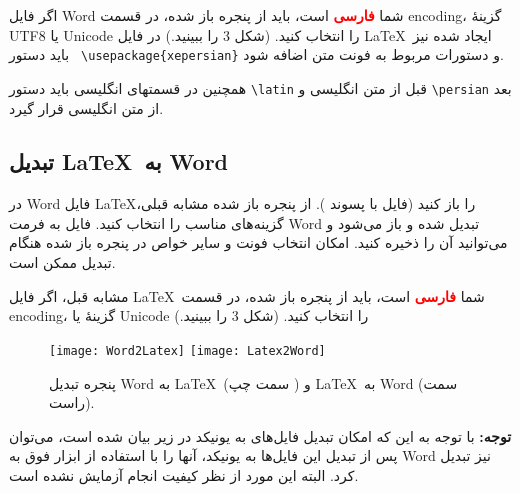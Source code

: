  اگر فایل Word شما \textcolor{red}{\bf فارسی} است، باید از پنجره باز شده، در قسمت encoding، 
 گزینۀ UTF8 یا Unicode  را انتخاب کنید. (شکل 3 را ببینید.) در فایل
 \LaTeX \ ایجاد شده نیز باید دستور \verb+ \usepackage{xepersian}+  و دستورات مربوط به فونت متن اضافه شود.
 
 همچنین در قسمتهای انگلیسی باید دستور \verb+\latin+  قبل از متن انگلیسی و \verb+\persian+ بعد از متن انگلیسی قرار گیرد.
 
 \subsection{تبدیل \LaTeX \ به Word}
  در Word   فایل \LaTeX  را باز کنید (فایل با پسوند ). از پنجره باز شده مشابه قبلی، گزینه‌های مناسب را انتخاب کنید. فایل  به فرمت 
  Word تبدیل شده و باز می‌شود و می‌توانید آن را ذخیره کنید. امکان انتخاب فونت و سایر خواص در پنجره باز شده هنگام تبدیل ممکن است.
  
  مشابه قبل، اگر فایل \LaTeX \ شما \textcolor{red}{\bf فارسی} است، باید از پنجره باز شده، در قسمت encoding، 
 گزینۀ  یا Unicode  را انتخاب کنید. (شکل 3 را ببینید.)  
\latin
\begin{figure}
\begin{center}
\texttt{[image: Word2Latex]} %
\texttt{[image: Latex2Word]}
\end{center}
\persian
\caption{پنجره تبدیل Word  به \LaTeX\  (سمت  چپ ) و \LaTeX\  به Word (سمت راست).}
\end{figure}

  \persian 

{\bf توجه:} با توجه به این که امکان تبدیل فایل‌های    به یونیکد در زیر بیان شده است، می‌توان پس از تبدیل
این فایل‌ها به یونیکد، آنها را با استفاده از ابزار فوق به Word  نیز تبدیل کرد. البته این مورد از نظر کیفیت انجام آزمایش نشده است.
